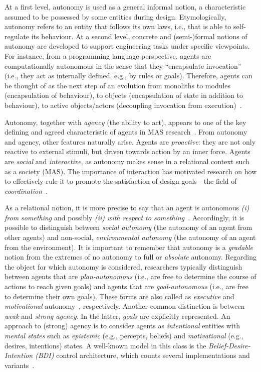 At a first level, autonomy is used as a general informal notion, a characteristic 
 assumed to be possessed by some entities during design.
%
Etymologically, autonomy refers to an entity that follows its own laws, i.e., that is able to self-regulate its behaviour.
%
At a second level, concrete and (semi-)formal notions of autonomy are developed to support engineering tasks under specific viewpoints.
%
For instance, from a programming language perspective, 
 agents are computationally autonomous in the sense that they ``encapsulate invocation'' (i.e., they act as internally defined, e.g., by rules or goals). Therefore, agents can be thought of as the next step of an evolution from monoliths to modules (encapsulation of behaviour), to objects
(encapsulation of state in addition to behaviour), to active objects/actors
(decoupling invocation from execution)~\cite{odell2002-objects-and-agents}.

Autonomy, together with \emph{agency} (the ability to act), appears to one of the key defining and agreed characteristic of agents in MAS research~\cite{franklin1996agent}.
%
From autonomy and agency, other features naturally arise.
%
Agents are \emph{proactive}: they are not only reactive to external stimuli, 
 but driven towards action by an inner force.
%
Agents are \emph{social} and \emph{interactive},
 as autonomy makes sense in a relational context such as a society (MAS).
%
The importance of interaction has motivated research 
 on how to effectively rule it to promote 
 the satisfaction of design goals---the field of \emph{coordination}~\cite{malone1994interdisciplinary}.

As a relational notion,
 it is more precise to say that 
 an agent is autonomous \emph{(i) from something}
 and possibly \emph{(ii) with respect to something}~\cite{Castelfranchi2003founding-autonomy}.
%
Accordingly, it is possible to distinguish
 between
 \emph{social autonomy} (the autonomy of an agent from other agents)
 and 
 non-social, \emph{environmental autonomy} (the autonomy of an agent from the environment).
%
It is important to remember that autonomy is a \emph{gradable} notion from the extremes of no autonomy to full or \emph{absolute} autonomy.
%
Regarding the object for which autonomy is considered,
 researchers typically distinguish between
 agents that are
 \emph{plan-autonomous} (i.e., are free to determine the course of actions to reach given goals)
 and agents that are \emph{goal-autonomous} (i.e., are free to determine their own goals).
%
These forms are also called as \emph{executive} and \emph{motivational} autonomy~\cite{castelfranchi1994guarantees-for-autonomy-cognitive-agent-arch}, respectively.
%
Another common distinction is 
 between \emph{weak} and \emph{strong agency}.
%
In the latter, \emph{goals} are explicitly represented.
%
An approach to (strong) agency is to consider agents 
 as \emph{intentional} entities with \emph{mental states}
 such as \emph{epistemic} (e.g., percepts, beliefs)
 and \emph{motivational} (e.g., desires, intentions) states.
%
A well-known model in this class is the \emph{Belief-Desire-Intention (BDI)} control architecture, which counts several implementations and variants~\cite{desilva2020bdi}.

